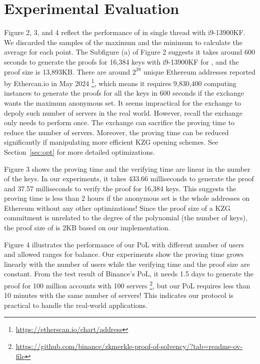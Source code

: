 \section{Experimental Evaluation}
Figure 2, 3, and 4 reflect the performance of \Sys in single thread with i9-13900KF. We discarded the samples of the maximum and the minimum to calculate the average for each point. The Subfigure (a) of Figure 2 suggests it takes around 600 seconds to generate the proofs for 16,384 keys with i9-13900KF for \bootstrap, and the proof size is 13,893KB. There are around $2^{28}$ unique Ethereum addresses reported by Ethercan.io in May 2024 \footnote{\url{https://etherscan.io/chart/address}}, which means it requires 9,830,400 computing instances to generate the proofs for all the keys in 600 seconds if the exchange wants the maximum anonymous set. It seems impractical for the exchange to depoly such number of servers in the real world. However, recall the exchange only needs to perform \bootstrap once. The exchange can sacrifice the proving time to reduce the number of servers. Moreover, the proving time can be reduced significantly if manipulating more efficient KZG opening schemes. See Section~\ref{sec:opt} for more detailed optimizations. 

Figure 3 shows the proving time and the verifying time are linear in the number of the keys. In our experiments, it takes 433.66 milliseconds to generate the proof and 37.57 milliseconds to verify the proof for 16,384 keys. This suggests the proving time is less than 2 hours if the anonymous set is the whole addresses on Ethereum without any other optimizations! Since the proof size of a KZG commitment is unrelated to the degree of the polynomial (the number of keys), the proof size of \poa is 2KB based on our implementation.

Figure 4 illustrates the performance of our PoL with different number of users and allowed ranges for balance. Our experiments show the proving time grows linearly with the number of users while the verifying time and the proof size are constant. From the test result of Binance's PoL, it needs 1.5 days to generate the proof for 100 million accounts with 100 servers \footnote{\url{https://github.com/binance/zkmerkle-proof-of-solvency/?tab=readme-ov-file}}, but our PoL requires less than 10 minutes with the same number of servers! This indicates our protocol is practical to handle the real-world applications.

